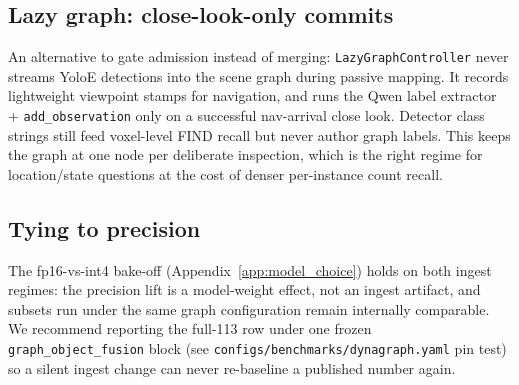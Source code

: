 \subsection{Lazy graph: close-look-only commits}
\label{app:lazy_graph}

An alternative to gate admission instead of merging: \texttt{LazyGraphController}
never streams YoloE detections into the scene graph during passive mapping. It records
lightweight viewpoint stamps for navigation, and runs the Qwen label extractor +
\texttt{add\_observation} only on a successful nav-arrival close look. Detector class
strings still feed voxel-level FIND recall but never author graph labels. This keeps
the graph at one node per deliberate inspection, which is the right regime for
location/state questions at the cost of denser per-instance count recall.

\subsection{Tying to precision}

The fp16-vs-int4 bake-off (Appendix~\ref{app:model_choice}) holds on both ingest
regimes: the precision lift is a model-weight effect, not an ingest artifact, and
subsets run under the same graph configuration remain internally comparable. We
recommend reporting the full-113 row under one frozen \texttt{graph\_object\_fusion}
block (see \texttt{configs/benchmarks/dynagraph.yaml} pin test) so a silent ingest
change can never re-baseline a published number again.
